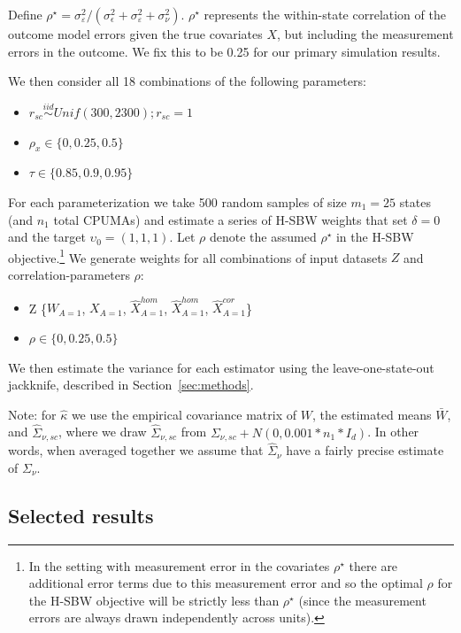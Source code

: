 Define $\rho^\star = \sigma^2_{\varepsilon}/(\sigma^2_{\epsilon} + \sigma^2_{\varepsilon} + \sigma^2_{\nu})$. $\rho^\star$ represents the within-state correlation of the outcome model errors given the true covariates $X$, but including the measurement errors in the outcome. We fix this to be 0.25 for our primary simulation results.

We then consider all 18 combinations of the following parameters:

\begin{itemize}
    \item $r_{sc} \stackrel{iid}\sim Unif(300, 2300); r_{sc} = 1$ 
    \item $\rho_x \in \{0, 0.25, 0.5\}$
    \item $\tau \in \{0.85, 0.9, 0.95\}$
\end{itemize}

For each parameterization we take 500 random samples of size $m_1 = 25$ states (and $n_1$ total CPUMAs) and estimate a series of H-SBW weights that set $\delta = 0$ and the target $\upsilon_0 = (1, 1, 1)$. Let $\rho$ denote the assumed $\rho^\star$ in the H-SBW objective.\footnote{In the setting with measurement error in the covariates $\rho^\star$ there are additional error terms due to this measurement error and so the optimal $\rho$ for the H-SBW objective will be strictly less than $\rho^\star$ (since the measurement errors are always drawn independently across units).} We generate weights for all combinations of input datasets $Z$ and correlation-parameters $\rho$:

\begin{itemize}
    \item Z \in \{$W_{A=1}$, $X_{A=1}$, $\hat{X}_{A=1}^{hom}$, $\hat{X}_{A=1}^{hom}$, $\hat{X}_{A=1}^{cor}$\}
    \item $\rho \in \{0, 0.25, 0.5\}$
\end{itemize}

We then estimate the variance for each estimator using the leave-one-state-out jackknife, described in Section~\ref{sec:methods}. 

Note: for $\hat{\kappa}$ we use the empirical covariance matrix of $W$, the estimated means $\bar{W}$, and $\hat{\Sigma}_{\nu, sc}$, where we draw $\hat{\Sigma}_{\nu, sc}$ from $\Sigma_{\nu, sc} + N(0, 0.001*n_1*I_d)$. In other words, when averaged together we assume that $\hat{\Sigma}_{\nu}$ have a fairly precise estimate of $\Sigma_{\nu}$.

\subsection{Selected results}

